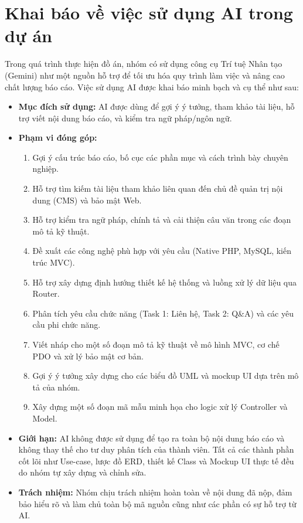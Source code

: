 \newpage
\section{Khai báo về việc sử dụng AI trong dự án}

Trong quá trình thực hiện đồ án, nhóm có sử dụng công cụ Trí tuệ Nhân tạo (Gemini) như một nguồn hỗ trợ để tối ưu hóa quy trình làm việc và nâng cao chất lượng báo cáo. Việc sử dụng AI được khai báo minh bạch và cụ thể như sau:

\begin{itemize}
    \item \textbf{Mục đích sử dụng:} AI được dùng để gợi ý ý tưởng, tham khảo tài liệu, hỗ trợ viết nội dung báo cáo, và kiểm tra ngữ pháp/ngôn ngữ.
    \item \textbf{Phạm vi đóng góp:} 
    \begin{enumerate}
        \item Gợi ý cấu trúc báo cáo, bố cục các phần mục và cách trình bày chuyên nghiệp.
        \item Hỗ trợ tìm kiếm tài liệu tham khảo liên quan đến chủ đề quản trị nội dung (CMS) và bảo mật Web.
        \item Hỗ trợ kiểm tra ngữ pháp, chính tả và cải thiện câu văn trong các đoạn mô tả kỹ thuật.
        \item Đề xuất các công nghệ phù hợp với yêu cầu (Native PHP, MySQL, kiến trúc MVC).
        \item Hỗ trợ xây dựng định hướng thiết kế hệ thống và luồng xử lý dữ liệu qua Router.
        \item Phân tích yêu cầu chức năng (Task 1: Liên hệ, Task 2: Q\&A) và các yêu cầu phi chức năng.
        \item Viết nháp cho một số đoạn mô tả kỹ thuật về mô hình MVC, cơ chế PDO và xử lý bảo mật cơ bản.
        \item Gợi ý ý tưởng xây dựng cho các biểu đồ UML và mockup UI dựa trên mô tả của nhóm.
        \item Xây dựng một số đoạn mã mẫu minh họa cho logic xử lý Controller và Model.
    \end{enumerate}
    \item \textbf{Giới hạn:} AI không được sử dụng để tạo ra toàn bộ nội dung báo cáo và không thay thế cho tư duy phân tích của thành viên. Tất cả các thành phần cốt lõi như Use-case, lược đồ ERD, thiết kế Class và Mockup UI thực tế đều do nhóm tự xây dựng và chỉnh sửa.
    \item \textbf{Trách nhiệm:} Nhóm chịu trách nhiệm hoàn toàn về nội dung đã nộp, đảm bảo hiểu rõ và làm chủ toàn bộ mã nguồn cũng như các phần có sự hỗ trợ từ AI.
\end{itemize}


